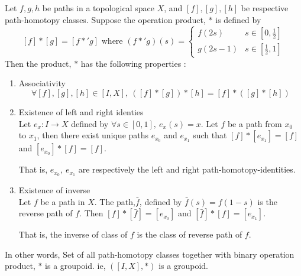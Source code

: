 \begin{theorem}
	Let $f,g,h$ be paths in a topological space $X$, and $[f],[g],[h]$ be respective path-homotopy classes. Suppose the operation product, $\ast$ is defined by
	\[ [f]\ast{}[g] = [f \ast{'} g] \text{ where } (f \ast{'} g)(s) = \begin{cases} f(2s) & s \in [0,\frac{1}{2}] \\ g(2s-1) & s \in [\frac{1}{2},1] \end{cases} \]
	Then the product, $\ast{}$ has the following properties : 
	\begin{enumerate}
		\item Associativity
			\[ \forall [f],[g],[h] \in [I,X],\ \left([f]\ast{}[g]\right)\ast{}[h] = [f] \ast{}\left([g]\ast{}[h]\right) \]
		\item Existence of left and right identies\\
			Let $e_x : I \to X$ defined by $\forall s \in [0,1],\ e_x(s) = x$. Let $f$ be a path from $x_0$ to $x_1$, then there exist unique paths $e_{x_0}$ and $e_{x_1}$ such that $[f]\ast{}[e_{x_1}] = [f]$ and $[e_{x_0}]\ast{}[f] = [f]$.
		\begin{commentary}
			That is, $e_{x_0},\ e_{x_1}$ are respectively the left and right path-homotopy-identities.
		\end{commentary}
		\item Existence of inverse\\
			Let $f$ be a path in $X$. The path,$\bar{f}$, defined by $\bar{f}(s) = f(1-s)$ is the reverse path of $f$. Then $[f]\ast{}[\bar{f}] = [e_{x_0}]$ and $[\bar{f}]\ast{}[f] = [e_{x_1}]$.
		\begin{commentary}
			That is, the inverse of class of $f$ is the class of reverse path of $f$.
		\end{commentary}
	\end{enumerate}
\begin{commentary}
	In other words, Set of all path-homotopy classes together with binary operation product, $\ast$ is a groupoid. ie, $([I,X],\ast{})$ is a groupoid.
\end{commentary}
\end{theorem}
